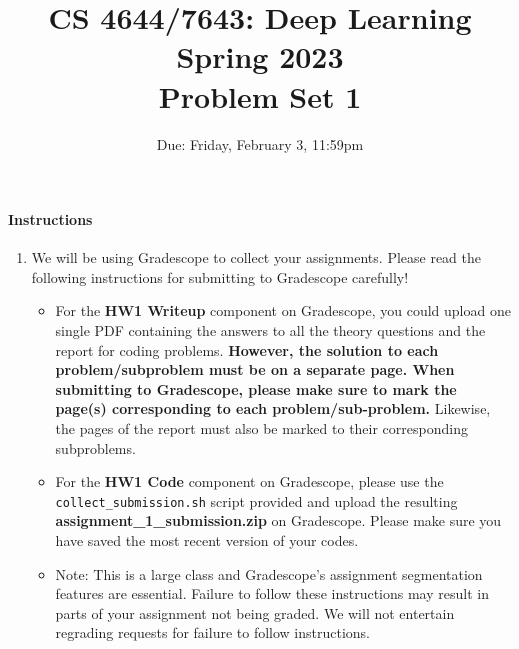 \documentclass[11pt,english]{article}
\begin{document}
\title{CS 4644/7643: Deep Learning\\
Spring 2023 \\
Problem Set 1}


\date{Due: Friday, February 3, 11:59pm}
\maketitle

\paragraph*{Instructions}
\begin{enumerate}
\item We will be using Gradescope to collect your assignments.  Please read the following instructions for submitting to Gradescope carefully!
     \begin{itemize}
          \item
               For the \textbf{HW1 Writeup} component on Gradescope, you could upload one single PDF containing the answers to all the theory questions and the report for coding problems. \textbf{However, the solution to each problem/subproblem must be on a separate page. When submitting to Gradescope, please make sure to mark the page(s) corresponding to each problem/sub-problem.} Likewise, the pages of the report must also be marked to their corresponding subproblems.
          \item
               For the \textbf{HW1 Code} component on Gradescope, 
               please use the \texttt{collect\_submission.sh} script provided and upload the resulting \textbf{assignment\_1\_submission.zip} on Gradescope. Please make sure you have saved the most recent version of your codes.
          \item
               Note: This is a large class and Gradescope's assignment segmentation features are essential.
               Failure to follow these instructions may result in parts of your assignment not being graded.
               We will not entertain regrading requests for failure to follow instructions.

     \end{itemize}


\end{enumerate}
\end{document}
